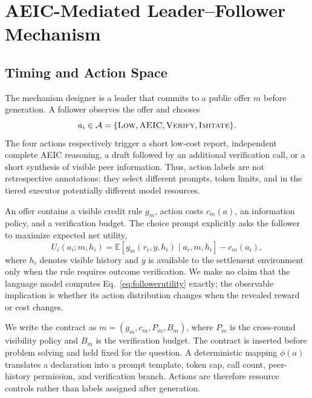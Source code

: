 \section{AEIC-Mediated Leader--Follower Mechanism}
\label{sec:game}

\subsection{Timing and Action Space}

The mechanism designer is a leader that commits to a public offer $m$ before generation. A follower observes the offer and chooses
\begin{equation}
 a_i\in\mathcal{A}=\{\textsc{Low},\textsc{AEIC},\textsc{Verify},\textsc{Imitate}\}.
\end{equation}
The four actions respectively trigger a short low-cost report, independent complete AEIC reasoning, a draft followed by an additional verification call, or a short synthesis of visible peer information. Thus, action labels are not retrospective annotations: they select different prompts, token limits, and in the tiered executor potentially different model resources.

An offer contains a visible credit rule $g_m$, action costs $c_m(a)$, an information policy, and a verification budget. The choice prompt explicitly asks the follower to maximize expected net utility,
\begin{equation}
 U_i(a_i;m,h_i)=\mathbb{E}[g_m(r_i,y,h_i)\mid a_i,m,h_i]-c_m(a_i),
 \label{eq:followerutility}
\end{equation}
where $h_i$ denotes visible history and $y$ is available to the settlement environment only when the rule requires outcome verification. We make no claim that the language model computes Eq.~\eqref{eq:followerutility} exactly; the observable implication is whether its action distribution changes when the revealed reward or cost changes.

We write the contract as $m=(g_m,c_m,P_m,B_m)$, where $P_m$ is the cross-round visibility policy and $B_m$ is the verification budget. The contract is inserted before problem solving and held fixed for the question. A deterministic mapping $\phi(a)$ translates a declaration into a prompt template, token cap, call count, peer-history permission, and verification branch. Actions are therefore resource controls rather than labels assigned after generation.

